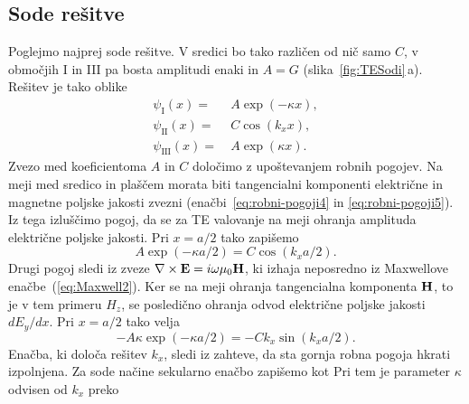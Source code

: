 \subsection*{Sode rešitve}
Poglejmo najprej sode rešitve. V sredici bo tako različen od nič samo $C$, 
v območjih I in III pa bosta amplitudi enaki in $A = G$ (slika~\ref{fig:TESodi}\,a). 
Rešitev je tako oblike 
\begin{align}
\psi_{\mathrm{I}}(x) =&~ A \exp(-\kappa x), \\
\psi_{\mathrm{II}}(x) =&~ C \cos(k_x x),\\
\psi_{\mathrm{III}}(x) =&~ A \exp(\kappa x).
\end{align}
Zvezo med koeficientoma $A$ in $C$ določimo z upoštevanjem robnih pogojev. Na meji
med sredico in plaščem morata biti tangencialni komponenti 
električne in magnetne poljske jakosti zvezni (enačbi~\ref{eq:robni-pogoji4} in 
\ref{eq:robni-pogoji5}). Iz tega  
izluščimo pogoj, da se za TE valovanje
na meji ohranja amplituda električne poljske jakosti. Pri $x = a/2$ tako zapišemo
\begin{equation}
A \exp(-\kappa a/2) = C \cos(k_x a/2).
\end{equation}
Drugi pogoj sledi iz zveze $\nabla\times{\bf E}=i\omega\mu_{0}{\bf H}$, ki izhaja
neposredno iz Maxwellove enačbe~(\ref{eq:Maxwell2}). Ker se na meji ohranja
tangencialna komponenta ${\bf H}$, to je v tem primeru $H_z$, se posledično ohranja 
odvod električne poljske jakosti $dE_y/dx$. 
Pri $x = a/2$ tako velja
\begin{equation}
-A \kappa \exp(-\kappa a/2) = -C k_x \sin(k_x a/2).
\end{equation}
Enačba, ki določa rešitev $k_x$, sledi iz zahteve, da sta gornja robna 
pogoja hkrati izpolnjena. Za sode načine sekularno enačbo zapišemo 
kot
Pri tem je parameter $\kappa$ odvisen od $k_x$ preko 

